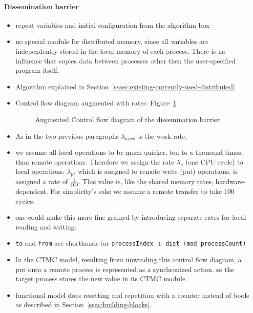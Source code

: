\documentclass[a4paper, 10pt]{article}
\begin{document}
\paragraph{Dissemination barrier}
\label{ssssec:analysis-modelchecking-modelling-dissemination}
\begin{itemize}
	\item repeat variables and initial configuration from the algorithm box
	\item no special module for distributed memory, since all variables are independently stored in the local memory of each process. There is no influence that copies data between processes other then the user-specified program itself.
	\item Algorithm explained in Section~\ref{sssec:existing-currently-used-distributed}
	\item Control flow diagram augmented with rates: Figure~\ref{fig:model-dissemination}
		\begin{figure}[htbp]
			\centering
			
			\caption{Augmented Control flow diagram of the dissemination barrier}
			\label{fig:model-dissemination}
		\end{figure}
	\item As in the two previous paragraphs $\lambda_{work}$ is the work rate.
	\item we assume all local operations to be much quicker, ten to a thousand times, than remote operations. Therefore we assign the rate $\lambda_c$ (one CPU cycle) to local operations. $\lambda_p$, which is assigned to remote write (put) operations, is assigned a rate of $\frac{1}{100}$. This value is, like the shared memory rates, hardware-dependent. For simplicity's sake we assume a remote transfer to take 100 cycles.
	\item one could make this more fine grained by introducing separate rates for local reading and writing.
	\item \texttt{to} and \texttt{from} are shorthands for \texttt{processIndex $\pm$ dist (mod processCount)}
	\item In the CTMC model, resulting from unwinding this control flow diagram, a put onto a remote process is represented as a synchronized action, so the target process stores the new value in its CTMC module.
	\item functional model does resetting and repetition with a counter instead of bools as described in Section~\ref{ssec:building-blocks}.
\end{itemize}
\end{document}
